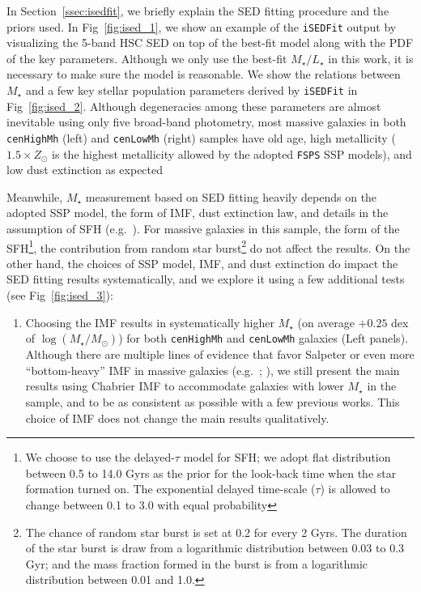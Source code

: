 \documentclass{emulateapj}
\def\rbcg{\texttt{cenHighMh}}
\def\nbcg{\texttt{cenLowMh}}
\def\mstar{{$M_{\star}$}}
\def\logms{{$\log (M_{\star}/M_{\odot})$}}
\def\m2l{{$M_{\star}/L_{\star}$}}
\begin{document}
\begin{CJK*}{UTF8}{gbsn}
    In Section~\ref{ssec:isedfit}, we briefly explain the SED fitting procedure and 
    the priors used.   
    In Fig~\ref{fig:ised_1}, we show an example of the \texttt{iSEDFit} output by 
    visualizing the 5-band HSC SED on top of the best-fit model along with the PDF 
    of the key parameters. 
    Although we only use the best-fit \m2l{} in this work, it is necessary to make 
    sure the model is reasonable. 
    We show the relations between \mstar{} and a few key stellar population parameters 
    derived by \texttt{iSEDFit} in Fig~\ref{fig:ised_2}. 
    Although degeneracies among these parameters are almost inevitable using only 
    five broad-band photometry, most massive galaxies in both \rbcg{} (left) and 
    \nbcg{} (right) samples have old age, high metallicity ($1.5 \times Z_{\odot}$ is 
    the highest metallicity allowed by the adopted \texttt{FSPS} SSP models), and low 
    dust extinction as expected
   
    Meanwhile, \mstar{} measurement based on SED fitting heavily depends on the 
    adopted SSP model, the form of IMF, dust extinction law, and details in 
    the assumption of SFH (e.g.\ \citealt{Bernardi2016b}). 
    For massive galaxies in this sample, the form of the SFH\footnote{We choose 
    to use the delayed-$\tau$ model for SFH; we adopt flat distribution between 
    0.5 to 14.0 Gyrs as the prior for the look-back time when the star formation 
    turned on. 
    The exponential delayed time-scale ($\tau$) is allowed to change between 
    0.1 to 3.0 with equal probability}, the contribution from random star 
    burst\footnote{The chance of random star burst is set at 0.2 for every 2 Gyrs. 
    The duration of the star burst is draw from a logarithmic distribution 
    between 0.03 to 0.3 Gyr; and the mass fraction formed in the burst is from 
    a logarithmic distribution between 0.01 and 1.0.} do not affect the results. 
    On the other hand, the choices of SSP model, IMF, and dust extinction do impact
    the SED fitting results systematically, and we explore it using a few 
    additional tests (see Fig~\ref{fig:ised_3}):

    \begin{enumerate}

        \item Choosing the \citet{Salpeter1955} IMF results in systematically 
            higher \mstar{} (on average $+0.25$ dex of \logms{}) for both \rbcg{}
            and \nbcg{} galaxies (Left panels).
            Although there are multiple lines of evidence that favor Salpeter 
            or even more ``bottom-heavy'' IMF in massive galaxies 
            (e.g.\ \citealt{Conroy2012}; \citealt{Cappellari2012}), we still 
            present the main results using Chabrier IMF to accommodate galaxies 
            with lower \mstar{} in the sample, and to be as consistent as possible 
            with a few previous works.  
            This choice of IMF does not change the main results qualitatively. 


\end{enumerate}
\end{CJK*}
\end{document}
